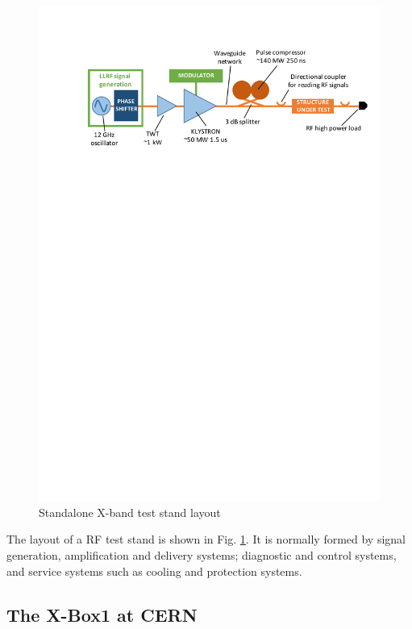 \begin{figure}[h]
\centering 
\includegraphics[scale=0.8]{pictures/test_stand_scheme.pdf}
\caption{Standalone X-band test stand layout}
\label{xbox_layout}
\end{figure}

The layout of a RF test stand is shown in Fig. \ref{xbox_layout}. It is normally formed by signal generation, amplification and delivery systems; diagnostic and control systems, and service systems such as cooling and protection systems. 


\subsection[The X-Box1 at CERN]{The X-Box1 at CERN}

